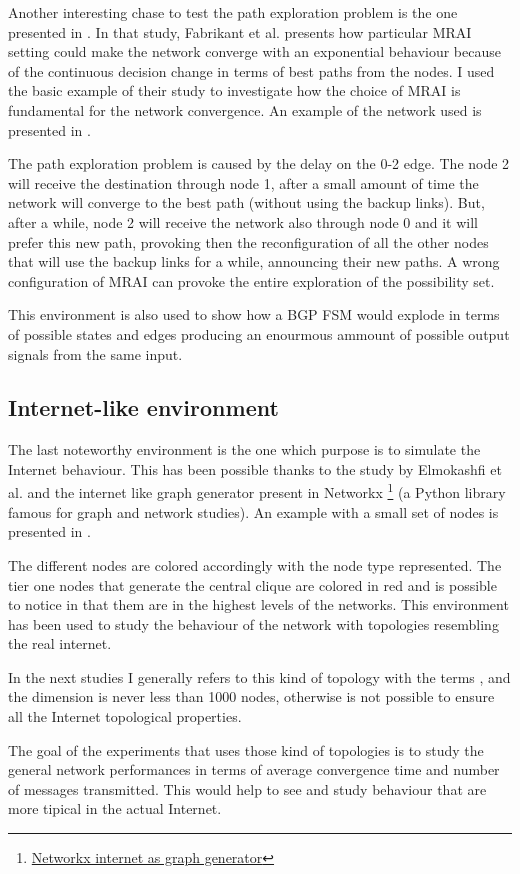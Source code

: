 Another interesting chase to test the path exploration problem is the one
presented in \cite{fabrikant2011there}.
In that study, Fabrikant et al. presents how particular \ac{MRAI} setting could 
make the network converge with an exponential behaviour because of the 
continuous decision change in terms of best paths from the nodes. 
I used the basic example of their study to investigate how the choice of \ac{MRAI}
is fundamental for the network convergence.
An example of the network used is presented in .

The path exploration problem is caused by the delay on the \num{0}-\num{2}
edge. The node \num{2} will receive the destination through node \num{1}, after a small amount
of time the network will converge to the best path (without using the backup links).
But, after a while, node \num{2} will receive the network also through node \num{0}
and it will prefer this new path, provoking then the reconfiguration of all
the other nodes that will use the backup links for a while, announcing their 
new paths.
A wrong configuration of \ac{MRAI} can provoke the entire exploration of the 
possibility set.

This environment is also used to show how a \ac{BGP} \ac{FSM} would explode
in terms of possible states and edges producing an enourmous ammount of possible
output signals from the same input.

\subsection{Internet-like environment}
\label{subsec:internet_like_env}

The last noteworthy environment is the one which purpose is to simulate the Internet
behaviour.
This has been possible thanks to the study by Elmokashfi et al. \cite{elmokashfi2010scalability}
and the internet like graph generator present in Networkx \footnote{\href{https://networkx.org/documentation/stable/reference/generated/networkx.generators.internet_as_graphs.random_internet_as_graph.html\#networkx.generators.internet_as_graphs.random_internet_as_graph}{Networkx internet as graph generator}}
(a Python library famous for graph and network studies).
An example with a small set of nodes is presented in .

The different nodes are colored accordingly with the node type represented.
The tier one nodes that generate the central clique are colored in red and
is possible to notice in  that them are
in the highest levels of the networks.
This environment has been used to study the behaviour of the network with 
topologies resembling the real internet.

In the next studies I generally refers to this kind of topology with the 
terms , and the dimension is never less than \num{1000} nodes,
otherwise is not possible to ensure all the Internet topological properties.

The goal of the experiments that uses those kind of topologies is to study
the general network performances in terms of average convergence time and 
number of messages transmitted.
This would help to see and study behaviour that are more tipical in the actual
Internet.
